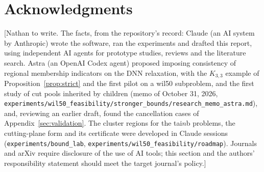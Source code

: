 \documentclass[11pt]{article}
\theoremstyle{remark}
\newcommand{\todo}[1]{{\color{red}[#1]}}
\begin{document}
\section*{Acknowledgments}
\todo{Nathan to write. The facts, from the repository's record: Claude (an AI
system by Anthropic) wrote the software, ran the experiments and drafted this
report, using independent AI agents for prototype studies, reviews and the
literature search. Astra (an OpenAI Codex agent) proposed imposing consistency
of regional membership indicators on the DNN relaxation, with the
$K_{3,3}$ example of Proposition~\ref{prop:strict} and the first pilot on a wil50
subproblem, and the first study of cut pools inherited by children (memo of October 31, 2026,
\texttt{experiments/wil50\_feasibility/stronger\_bounds/research\_memo\_astra.md}),
and, reviewing an earlier draft, found the cancellation cases of
Appendix~\ref{sec:validation}. The cluster regions for the tai$n$b problems, the
cutting-plane form and its certificate were developed in Claude sessions
(\texttt{experiments/bound\_lab}, \texttt{experiments/wil50\_feasibility/roadmap}).
Journals and arXiv require disclosure of the use of AI tools; this section and
the authors' responsibility statement should meet the target journal's policy.}
\end{document}
